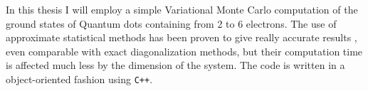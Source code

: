 In this thesis I will employ a simple Variational Monte Carlo computation of the ground states of Quantum dots containing from 2 to 6 electrons.
The use of approximate statistical methods has been proven to give really accurate results\cite{Pederiva2000,Harju1999,Harju2005,PedersenLohne2011,Colletti2002}
, even comparable with exact diagonalization methods, but their computation time is affected much less by the dimension of the system.
The code is written in a object-oriented fashion using \texttt{C++}.
